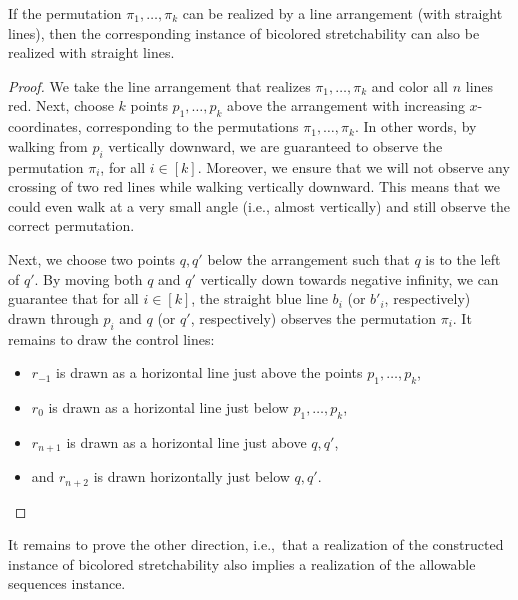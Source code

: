 \documentclass[a4paper,UKenglish,cleveref, autoref, thm-restate, nolineno]{socg-lipics-v2021}
\newcommand{\AS}{allowable sequences\xspace}
\begin{document}
\begin{lemma}
\label{lemma:bic_stretch_2}
    If the permutation $\pi_1, \dots, \pi_k$ can be realized by a line arrangement (with straight lines), then the corresponding instance of bicolored stretchability can also be realized with straight lines.
\end{lemma}
\begin{proof}
    We take the line arrangement that realizes $\pi_1, \dots, \pi_k$ and color all $n$ lines red. Next, choose $k$ points $p_1, \dots, p_k$ above the arrangement with increasing $x$-coordinates, corresponding to the permutations $\pi_1, \dots, \pi_k$. In other words, by walking from $p_i$ vertically downward, we are guaranteed to observe the permutation $\pi_i$, for all $i \in [k]$. Moreover, we ensure that we will not observe any crossing of two red lines while walking vertically downward. This means that we could even walk at a very small angle (i.e., almost vertically) and still observe the correct permutation.
    
    Next, we choose two points $q, q'$ below the arrangement such that $q$ is to the left of $q'$. By moving both $q$ and $q'$ vertically down towards negative infinity, we can guarantee that for all $i \in [k]$, the straight blue line $b_i$ (or $b'_i$, respectively) drawn through $p_i$ and $q$ (or $q'$, respectively) observes the permutation $\pi_i$. It remains to draw the control lines:
    \begin{itemize}
        \item $r_{-1}$ is drawn as a horizontal line just above the points $p_1, \dots, p_k$,
        \item $r_0$ is drawn as a horizontal line just below $p_1, \dots, p_k$,
        \item $r_{n + 1}$ is drawn as a horizontal line just above $q, q'$,
        \item and $r_{n + 2}$ is drawn horizontally just below $q, q'$. \qedhere
    \end{itemize}   
\end{proof}

It remains to prove the other direction, i.e.,\ that a realization of the constructed instance of bicolored stretchability also implies a realization of the \AS instance.
\end{document}
